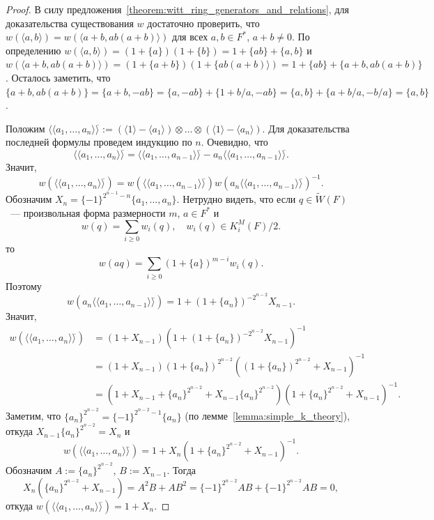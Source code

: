 \documentclass[a4paper,oneside,12pt]{article}
\theoremstyle{plain} { \swapnumbers
\newtheorem{theorem}{Теорема}[subsection]
\newtheorem{corollary}[theorem]{Следствие}
\newtheorem{lemma}[theorem]{Лемма}
\newtheorem{proposition}[theorem]{Утверждение}
\newtheorem{claim}[theorem]{Факт}
}
\theoremstyle{definition} { \swapnumbers
\newtheorem{definition}[theorem]{Определение}
\newtheorem{notation}[theorem]{Обозначение}
\newtheorem{remark}[theorem]{Замечание}
\newtheorem{remarks}[theorem]{Замечания}
\newtheorem{example}[theorem]{Пример}
\newtheorem{examples}[theorem]{Примеры}
\newtheorem{sssection}[theorem]{}
}
\def\tilde{\widetilde}
\def\la{\langle}
\def\ra{\rangle}
\def\lla{\la\!\la}
\def\rra{\ra\!\ra}
\begin{document}
\begin{proof}
В силу предложения~\ref{theorem:witt_ring_generators_and_relations}, для доказательства существования $w$
достаточно проверить, что $w(\la a,b\ra)=w(\la a+b,ab(a+b)\ra)$ для всех $a,b\in F^*$, $a+b\neq 0$.
По определению $w(\la a,b\ra)=(1+\{a\})(1+\{b\})=1+\{ab\}+\{a,b\}$ и
$w(\la a+b,ab(a+b)\ra)=(1+\{a+b\})(1+\{ab(a+b)\ra)=1+\{ab\}+\{a+b,ab(a+b)\}$.
Осталось заметить, что $\{a+b,ab(a+b)\}=\{a+b,-ab\}=\{a,-ab\}+\{1+b/a,-ab\}=\{a,b\}+\{a+b/a,-b/a\}=\{a,b\}$.

Положим $\lla a_1,\dots,a_n\rra^{\tilde{}}:=(\la 1\ra-\la a_1\ra)\otimes\dots\otimes(\la 1\ra-\la a_n\ra)$.
Для доказательства последней формулы проведем индукцию по $n$. Очевидно, что
$$
\lla a_1,\dots,a_n\rra^{\tilde{}}=\lla a_1,\dots,a_{n-1}\rra^{\tilde{}}-a_n\lla a_1,\dots,a_{n-1}\rra^{\tilde{}}.
$$
Значит,
$$
w(\lla a_1,\dots,a_n\rra^{\tilde{}})=w(\lla a_1,\dots,a_{n-1}\rra^{\tilde{}})w(a_n\lla a_1,\dots,a_{n-1}\rra^{\tilde{}})^{-1}.
$$
Обозначим $X_n=\{-1\}^{2^{n-1}-n}\{a_1,\dots,a_n\}$.
Нетрудно видеть, что если $q\in \tilde W(F)$~--- произвольная форма размерности $m$, $a\in F^*$ и
$$
w(q)=\sum_{i\geq 0} w_i(q),\quad w_i(q)\in K_i^M(F)/2.
$$
то
$$
w(aq)=\sum_{i\geq 0}(1+\{a\})^{m-i}w_i(q).
$$
Поэтому
$$
w(a_n\lla a_1,\dots,a_{n-1}\rra^{\tilde{}})=1+(1+\{a_n\})^{-2^{n-2}}X_{n-1}.
$$
Значит,
$$
\begin{aligned}
w(\lla a_1,\dots,a_n\rra^{\tilde{}})&=(1+X_{n-1})(1+(1+\{a_n\})^{-2^{n-2}}X_{n-1})^{-1}\\
&=(1+X_{n-1})(1+\{a_n\})^{2^{n-2}}\left((1+\{a_n\})^{2^{n-2}}+X_{n-1}\right)^{-1}\\
&=(1+X_{n-1}+\{a_n\}^{2^{n-2}}+X_{n-1}\{a_n\}^{2^{n-2}})(1+\{a_n\}^{2^{n-2}}+X_{n-1})^{-1}.
\end{aligned}
$$
Заметим, что $\{a_n\}^{2^{n-2}}=\{-1\}^{2^{n-2}-1}\{a_n\}$ (по лемме~\ref{lemma:simple_k_theory}),
откуда
$X_{n-1}\{a_n\}^{2^{n-2}}=X_n$ и
$$
w(\lla a_1,\dots,a_n\rra^{\tilde{}})=1+X_n(1+\{a_n\}^{2^{n-2}}+X_{n-1})^{-1}.
$$
Обозначим $A:=\{a_n\}^{2^{n-2}}$, $B:=X_{n-1}$. Тогда
$$
X_n(\{a_n\}^{2^{n-2}}+X_{n-1})=A^2B+AB^2=\{-1\}^{2^{n-2}}AB+\{-1\}^{2^{n-2}}AB=0,
$$
откуда $w(\lla a_1,\dots,a_n\rra^{\tilde{}})=1+X_n$.
\end{proof}
\end{document}
